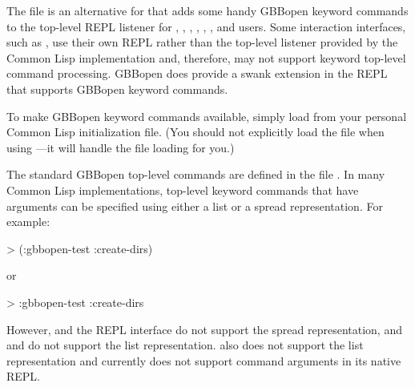 \documentclass[10pt,twoside,english,pdftex]{article}
\begin{document}
%

%
The file is an
alternative for  that adds
some handy GBBopen keyword commands to the top-level REPL listener for
,
,
,
,
,
,
 and
users.  Some interaction
interfaces, such as ,
use their own REPL rather than the top-level listener
provided by the Common Lisp implementation and, therefore, may not support
keyword top-level command processing.  GBBopen does provide a swank extension
in the  REPL that
supports GBBopen keyword commands.

To make GBBopen keyword commands available, simply load
 from your personal
Common Lisp initialization file.  (You should not explicitly load the
 file when using
---it will handle the
 file loading for you.)

The standard GBBopen top-level commands are defined in the file
. 
In many Common Lisp implementations, top-level keyword commands that have
arguments can be specified using either a list or a spread representation.
For example:

\begin{example}
> (:gbbopen-test :create-dirs)
\end{example}
or
\begin{example}
> :gbbopen-test :create-dirs
\end{example}
However,  and the
 REPL interface do not
support the spread representation, and  and
 do not support the list
representation.   also does not
support the list representation and currently does not support command
arguments in its native REPL.
\end{document}
